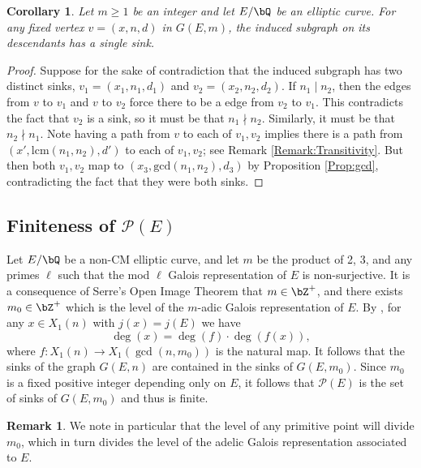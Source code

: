 \documentclass[11pt,reqno]{amsart}
\theoremstyle{plain}
\newtheorem{corollary}[theorem]{Corollary}
\theoremstyle{definition}
\newtheorem{remark}[theorem]{Remark}
\newcommand{\Q}{\bQ}
\newcommand{\Z}{\bZ}
\newcommand{\abbey}[1]{\textcolor{blue}{Abbey: #1}}
\newcommand{\abedit}[1]{{\color{blue} #1}}
\begin{document}
\begin{corollary}\label{Cor:SingleSink}
   Let $m\geq 1$ be an integer and let $E/\Q$ be an elliptic curve. \abedit{For any fixed vertex $v=(x,n,d)$ in $G(E,m)$, the induced subgraph on its descendants has a single sink.}
\end{corollary}

\begin{proof}
Suppose for the sake of contradiction that \abedit{the induced subgraph} has two distinct sinks, $v_1=(x_1,n_1,d_1)$ and $v_2=(x_2,n_2,d_2)$. \abedit{If $n_1 \mid n_2$, then the edges from $v$ to $v_1$ and $v$ to $v_2$ force there to be a edge from $v_2$ to $v_1$. This contradicts the fact that $v_2$ is a sink, so it must be that $n_1 \nmid n_2$. Similarly, it must be that $n_2 \nmid n_1$. Note} having a path from $v$ to each of $v_1,v_2$ implies there is a path from $(x',\text{lcm}(n_1,n_2),d')$ to each of $v_1,v_2$; see Remark \ref{Remark:Transitivity}. But then both $v_1,v_2$ map to $(x_3,\text{gcd}(n_1,n_2),d_3)$ by Proposition \ref{Prop:gcd}, contradicting the fact that they were both sinks.
\end{proof}

\subsection{\texorpdfstring{Finiteness of $\mathcal{P}(E)$}{Finiteness of P(E)}} Let $E/\Q$ be a non-CM elliptic curve, and let $m$ be the product of 2, 3, and any primes $\ell$ such that the mod $\ell$ Galois representation of $E$ is non-surjective. It is a consequence of Serre's Open Image Theorem \cite{serre72} that $m \in \Z^+$, and there exists $m_0 \in \Z^+$ which is the level of the $m$-adic Galois representation of $E$. By \cite[Theorem 5.1]{BELOV}, for any $x \in X_1(n)$ with $j(x)=j(E)$ we have
\[
\deg(x)=\deg(f) \cdot \deg(f(x)),
\]
where $f: X_1(n) \rightarrow X_1(\gcd(n,m_0))$ is the natural map. It follows that the sinks of the graph $G(E,n)$ are contained in the sinks of $G(E,m_0)$. Since $m_0$ is a fixed positive integer depending only on $E$, it follows that $\mathcal{P}(E)$ is the set of sinks of $G(E,m_0)$ and thus is finite.

\begin{remark}\label{Rmk:Level}
    We note in particular that the level of any primitive point will divide $m_0$, which in turn divides the level of the adelic Galois representation associated to $E$.
\end{remark}
\end{document}
